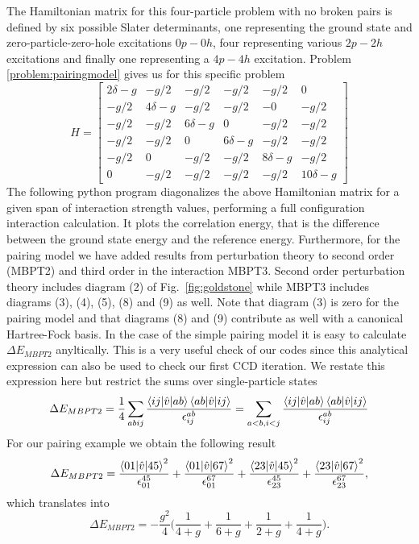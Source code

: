 The Hamiltonian matrix for this   four-particle problem with no broken pairs is defined by six possible Slater determinants,
one representing the ground state and zero-particle-zero-hole excitations $0p-0h$, four representing various $2p-2h$ excitations and finally one representing a $4p-4h$ excitation. Problem \ref{problem:pairingmodel} gives us for this specific problem
  \[
  H = \begin{bmatrix}
  2\delta -g & -g/2 & -g/2 & -g/2 & -g/2 & 0 \\ -g/2 & 4\delta -g &
  -g/2 & -g/2 & -0 & -g/2 \\ -g/2 & -g/2 & 6\delta -g & 0 & -g/2 &
  -g/2 \\ -g/2 & -g/2 & 0 & 6\delta-g & -g/2 & -g/2 \\ -g/2 & 0 & -g/2
  & -g/2 & 8\delta-g & -g/2 \\ 0 & -g/2 & -g/2 & -g/2 & -g/2 &
  10\delta -g
  \end{bmatrix}
  \]
  The following python program diagonalizes the above Hamiltonian
  matrix for a given span of interaction strength values, performing
  a full configuration interaction calculation. It plots the correlation energy, that is the difference between the ground state energy and the reference energy. Furthermore, for the pairing model we have added results from perturbation theory to second order (MBPT2)
and third order in the interaction MBPT3. Second order perturbation theory includes diagram (2) of Fig.~\ref{fig:goldstone}
while MBPT3 includes diagrams (3), (4), (5), (8) and (9) as well. Note that diagram (3) is zero for the pairing model and that diagrams (8) and (9) contribute as well with a canonical Hartree-Fock basis. 
  In the case of the simple pairing model it is easy to calculate
  $\Delta E_{MBPT2}$ anyltically. This is a very useful  check of our codes since this analytical expression  can  also be used to check our first CCD iteration.
We restate this expression here but restrict the sums over single-particle states
  \[
  \Delta E_{MBPT2} = \frac{1}{4} \sum_{abij} \frac{\braket{ij|\hat{v}|ab}
    \braket{ab|\hat{v}|ij}}{ \epsilon_{ij}^{ab}} = \sum_{a<b,i<j}
  \frac{\braket{ij|\hat{v}|ab} \braket{ab|\hat{v}|ij}}{ \epsilon_{ij}^{ab}}
  \]
  For our pairing example we obtain the following result
  \[
  \Delta E_{MBPT2} = \frac{\braket{01|\hat{v}|45}^2}{\epsilon_{01}^{45}} +
  \frac{\braket{01|\hat{v}|67}^2}{\epsilon_{01}^{67}} +
  \frac{\braket{23|\hat{v}|45}^2}{\epsilon_{23}^{45}} +
  \frac{\braket{23|\hat{v}|67}^2}{\epsilon_{23}^{67}},
  \]
which translates into
  \[
  \Delta E_{MBPT2} = -\frac{g^2}{4} \bigg( \frac{1}{ 4 + g} +
  \frac{1}{ 6 + g} + \frac{1}{ 2 + g} + \frac{1}{ 4 + g} \bigg).
  \]
